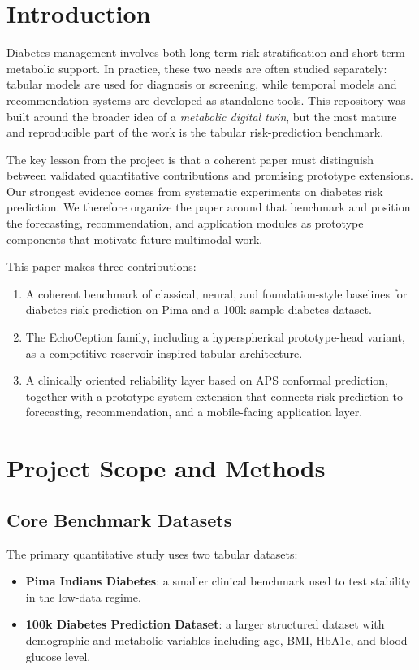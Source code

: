 \documentclass[conference]{IEEEtran}
\begin{document}
\section{Introduction}
Diabetes management involves both long-term risk stratification and short-term metabolic support. In practice, these two needs are often studied separately: tabular models are used for diagnosis or screening, while temporal models and recommendation systems are developed as standalone tools. This repository was built around the broader idea of a \emph{metabolic digital twin}, but the most mature and reproducible part of the work is the tabular risk-prediction benchmark.

The key lesson from the project is that a coherent paper must distinguish between validated quantitative contributions and promising prototype extensions. Our strongest evidence comes from systematic experiments on diabetes risk prediction. We therefore organize the paper around that benchmark and position the forecasting, recommendation, and application modules as prototype components that motivate future multimodal work.

This paper makes three contributions:
\begin{enumerate}
    \item A coherent benchmark of classical, neural, and foundation-style baselines for diabetes risk prediction on Pima and a 100k-sample diabetes dataset.
    \item The EchoCeption family, including a hyperspherical prototype-head variant, as a competitive reservoir-inspired tabular architecture.
    \item A clinically oriented reliability layer based on APS conformal prediction, together with a prototype system extension that connects risk prediction to forecasting, recommendation, and a mobile-facing application layer.
\end{enumerate}

\section{Project Scope and Methods}

\subsection{Core Benchmark Datasets}
The primary quantitative study uses two tabular datasets:
\begin{itemize}
    \item \textbf{Pima Indians Diabetes}: a smaller clinical benchmark used to test stability in the low-data regime.
    \item \textbf{100k Diabetes Prediction Dataset}: a larger structured dataset with demographic and metabolic variables including age, BMI, HbA1c, and blood glucose level.
\end{itemize}
\end{document}
